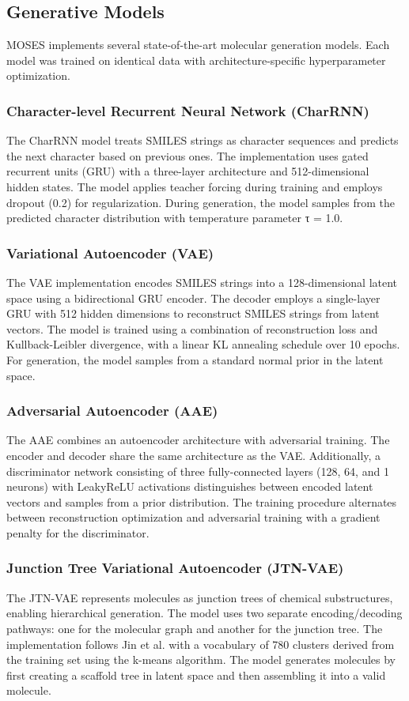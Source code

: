 \documentclass[conference]{IEEEtran}
\begin{document}
\subsection{Generative Models}
MOSES implements several state-of-the-art molecular generation models. Each model was trained on identical data with architecture-specific hyperparameter optimization.

\subsubsection{Character-level Recurrent Neural Network (CharRNN)}
The CharRNN model treats SMILES strings as character sequences and predicts the next character based on previous ones. The implementation uses gated recurrent units (GRU) with a three-layer architecture and 512-dimensional hidden states. The model applies teacher forcing during training and employs dropout (0.2) for regularization. During generation, the model samples from the predicted character distribution with temperature parameter τ = 1.0.

\subsubsection{Variational Autoencoder (VAE)}
The VAE implementation encodes SMILES strings into a 128-dimensional latent space using a bidirectional GRU encoder. The decoder employs a single-layer GRU with 512 hidden dimensions to reconstruct SMILES strings from latent vectors. The model is trained using a combination of reconstruction loss and Kullback-Leibler divergence, with a linear KL annealing schedule over 10 epochs. For generation, the model samples from a standard normal prior in the latent space.

\subsubsection{Adversarial Autoencoder (AAE)}
The AAE combines an autoencoder architecture with adversarial training. The encoder and decoder share the same architecture as the VAE. Additionally, a discriminator network consisting of three fully-connected layers (128, 64, and 1 neurons) with LeakyReLU activations distinguishes between encoded latent vectors and samples from a prior distribution. The training procedure alternates between reconstruction optimization and adversarial training with a gradient penalty for the discriminator.

\subsubsection{Junction Tree Variational Autoencoder (JTN-VAE)}
The JTN-VAE represents molecules as junction trees of chemical substructures, enabling hierarchical generation. The model uses two separate encoding/decoding pathways: one for the molecular graph and another for the junction tree. The implementation follows Jin et al. \cite{Jin2018} with a vocabulary of 780 clusters derived from the training set using the k-means algorithm. The model generates molecules by first creating a scaffold tree in latent space and then assembling it into a valid molecule.
\end{document}
